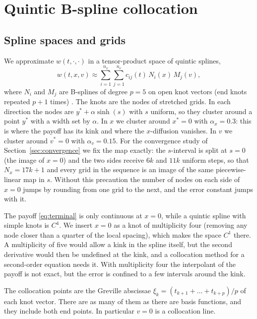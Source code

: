 \section{Quintic B-spline collocation}\label{sec:method}

\subsection{Spline spaces and grids}

We approximate $w(t,\cdot,\cdot)$ in a tensor-product space of quintic splines,
\begin{equation}\label{eq:tensor}
w(t,x,v) \approx \sum_{i=1}^{n_x}\sum_{j=1}^{n_v} c_{ij}(t)\,N_i(x)\,M_j(v),
\end{equation}
where $N_i$ and $M_j$ are B-splines of degree $p=5$ on open knot vectors (end knots repeated $p+1$ times)
\citep{deBoor2001}. The knots are the nodes of stretched grids. In each direction the nodes are
$y^\ast + \alpha\sinh(s)$ with $s$ uniform, so they cluster around a point $y^\ast$ with a width set by
$\alpha$. In $x$ we cluster around $x^\ast=0$ with $\alpha_x=0.3$: this is where the payoff has its kink
and where the $x$-diffusion vanishes. In $v$ we cluster around $v^\ast=0$ with $\alpha_v=0.15$.
For the convergence study of Section~\ref{sec:convergence} we fix the map exactly: the $s$-interval is
split at $s=0$ (the image of $x=0$) and the two sides receive $6k$ and $11k$ uniform steps, so that
$N_x = 17k+1$ and every grid in the sequence is an image of the same piecewise-linear map in $s$. Without
this precaution the number of nodes on each side of $x=0$ jumps by rounding from one grid to the next,
and the error constant jumps with it.

The payoff \eqref{eq:terminal} is only continuous at $x=0$, while a quintic spline with simple knots is
$C^4$. We insert $x=0$ as a knot of multiplicity four (removing any node closer than a quarter of the
local spacing), which makes the space $C^1$ there. A multiplicity of five would allow a kink in the
spline itself, but the second derivative would then be undefined at the kink, and a collocation method for
a second-order equation needs it. With multiplicity four the interpolant of the payoff is not exact, but
the error is confined to a few intervals around the kink.

The collocation points are the Greville abscissae $\xi_k = (t_{k+1}+\dots+t_{k+p})/p$ of each knot
vector. There are as many of them as there are basis functions, and they include both end points. In
particular $v=0$ is a collocation line.

